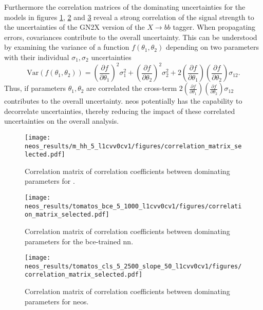 Furthermore the correlation matrices of the dominating uncertainties for the models in figures \ref{fig:correlation_matrix_m_hh}, \ref{fig:correlation_matrix_bce} and \ref{fig:correlation_matrix_cls} reveal a strong correlation of the signal strength to the uncertainties of the GN2X version of the $X\rightarrow bb$ tagger. When propagating errors, covariances contribute to the overall uncertainty. This can be understood by examining the variance of a function $f(\theta_1, \theta_2)$ depending on two parameters with their individual $\sigma_1,\sigma_2$ uncertainties
\begin{equation}
    \text{Var}(f(\theta_1, \theta_2)) = \left( \frac{\partial f}{\partial \theta_1} \right)^2 \sigma_1^2 + \left( \frac{\partial f}{\partial \theta_2} \right)^2 \sigma_2^2 + 2 \left( \frac{\partial f}{\partial \theta_1} \right) \left( \frac{\partial f}{\partial \theta_2} \right) \sigma_{12}.
\end{equation}
Thus, if parameters $\theta_1, \theta_2$ are correlated the cross-term \(2 \left( \frac{\partial f}{\partial \theta_1} \right) \left( \frac{\partial f}{\partial \theta_2} \right) \sigma_{12}\) contributes to the overall uncertainty.  \ac{neos} potentially has the capability to decorrelate uncertainties, thereby reducing the impact of these correlated uncertainties on the overall analysis.

\begin{figure}
    \centering
    \texttt{[image: neos\_results/m\_hh\_5\_l1cvv0cv1/figures/correlation\_matrix\_selected.pdf]}
    \caption[]{Correlation matrix of correlation coefficients between dominating parameters for \mhh.}
    \label{fig:correlation_matrix_m_hh}
\end{figure}
\begin{figure}
    \centering
    \texttt{[image: neos\_results/tomatos\_bce\_5\_1000\_l1cvv0cv1/figures/correlation\_matrix\_selected.pdf]}
    \caption[]{Correlation matrix of correlation coefficients between dominating parameters for the \ac{bce}-trained \ac{nn}.}
    \label{fig:correlation_matrix_bce}
\end{figure}
\begin{figure}
    \centering
    \texttt{[image: neos\_results/tomatos\_cls\_5\_2500\_slope\_50\_l1cvv0cv1/figures/correlation\_matrix\_selected.pdf]}
    \caption[]{Correlation matrix of correlation coefficients between dominating parameters for \ac{neos}.}
    \label{fig:correlation_matrix_cls}
\end{figure}

